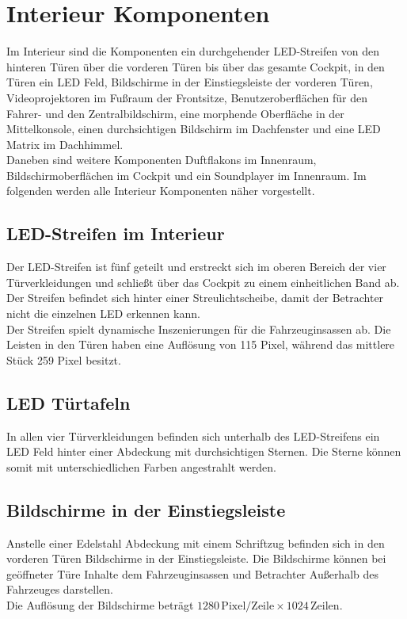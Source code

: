 \section{Interieur Komponenten}
Im Interieur sind die Komponenten ein durchgehender LED-Streifen von den hinteren Türen über die vorderen Türen bis über das gesamte Cockpit, in den Türen ein LED Feld, Bildschirme in der Einstiegsleiste der vorderen Türen, Videoprojektoren im Fußraum der Frontsitze, Benutzeroberflächen für den Fahrer- und den Zentralbildschirm, eine morphende Oberfläche in der Mittelkonsole, einen durchsichtigen Bildschirm im Dachfenster und eine LED Matrix im Dachhimmel.\\
Daneben sind weitere Komponenten Duftflakons im Innenraum, Bildschirmoberflächen im Cockpit und ein Soundplayer im Innenraum.
Im folgenden werden alle Interieur Komponenten näher vorgestellt.
\subsection{LED-Streifen im Interieur}
Der LED-Streifen ist fünf geteilt und erstreckt sich im oberen Bereich der vier Türverkleidungen und schließt über das Cockpit zu einem einheitlichen Band ab. Der Streifen befindet sich hinter einer Streulichtscheibe, damit der Betrachter nicht die einzelnen LED erkennen kann. \\
Der Streifen spielt dynamische Inszenierungen für die Fahrzeuginsassen ab.
Die Leisten in den Türen haben eine Auflösung von 115 Pixel, während das mittlere Stück 259 Pixel besitzt.
\subsection{LED Türtafeln}
In allen vier Türverkleidungen befinden sich unterhalb des LED-Streifens ein LED Feld hinter einer Abdeckung mit durchsichtigen Sternen. Die Sterne können somit mit unterschiedlichen Farben angestrahlt werden.\\
\subsection{Bildschirme in der Einstiegsleiste}
Anstelle einer Edelstahl Abdeckung mit einem Schriftzug befinden sich in den vorderen Türen Bildschirme in der Einstiegsleiste. Die Bildschirme können bei geöffneter Türe Inhalte dem Fahrzeuginsassen und Betrachter Außerhalb des Fahrzeuges darstellen.\\
Die Auflösung der Bildschirme beträgt $ 1280 \,\mathrm{Pixel}/\mathrm{Zeile} \times 1024 \,\mathrm{Zeilen} $.
